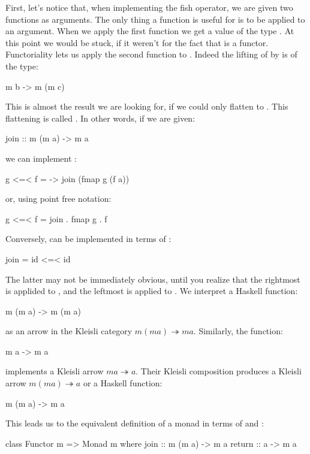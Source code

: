 \documentclass[DaoFP]{subfiles}
\begin{document}
First, let's notice that, when implementing the fish operator, we are given two functions as arguments. The only thing a function is useful for is to be applied to an argument. When we apply the first function  we get a value of the type . At this point we would be stuck, if it weren't for the fact that  is a functor. Functoriality lets us apply the second function  to . Indeed the lifting of  by  is of the type:
\begin{haskell}
m b -> m (m c)
\end{haskell}
This is almost the result we are looking for, if we could only flatten  to . This flattening is called . In other words, if we are given:
\begin{haskell}
join ::  m (m a) -> m a
\end{haskell}
we can implement \hask{<=<}:
\begin{haskell}
g <=< f = \a -> join (fmap g (f a))
\end{haskell}
or, using point free notation:
\begin{haskell}
g <=< f = join . fmap g . f
\end{haskell}

Conversely,  can be implemented in terms of \hask{<=<}:
\begin{haskell}
join = id <=< id
\end{haskell}
The latter may not be immediately obvious, until you realize that the rightmost  is applided to , and the leftmost is applied to . We interpret a Haskell function:
\begin{haskell}
m (m a) -> m (m a)
\end{haskell}
as an arrow in the Kleisli category $ m (m a) \twoheadrightarrow m a$. Similarly, the function:
\begin{haskell}
m a -> m a
\end{haskell}
implements a Kleisli arrow $m a \twoheadrightarrow a$. Their Kleisli composition produces a Kleisli arrow $m (m a) \twoheadrightarrow a$ or a Haskell function:
\begin{haskell}
m (m a) -> m a
\end{haskell}

This leads us to the equivalent definition of a monad in terms of  and :
\begin{haskell}
class Functor m => Monad m where
  join :: m (m a) -> m a
  return :: a -> m a
\end{haskell}
\end{document}

